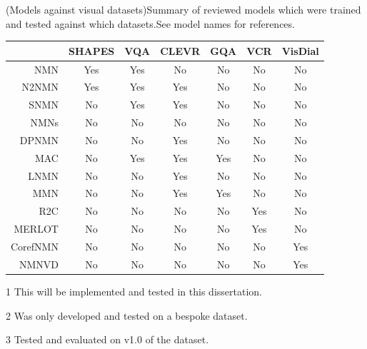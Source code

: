 \begin{table}[]
\captionsource(Models against visual datasets){Summary of reviewed models which were trained and tested against which datasets.\label{tab:models_against_datasets}}{See model names for references.}
\begin{threeparttable}
    \begin{tabular}{@{}rcccccc@{}}
        \toprule
                    & SHAPES & VQA          & CLEVR & GQA & VCR & VisDial \\ \midrule
        NMN\cite{andreas_neural_2016}               & Yes    & Yes          & No    & No  & No  & No      \\
        N2NMN\cite{hu_learning_2017}                & Yes    & Yes          & Yes   & No  & No  & No      \\
        SNMN\cite{hu_explainable_2019}              & No     & Yes          & Yes   & No  & No\tnote{1} & No      \\
        NMNs\pm{}\cite{chen_teaching_2022}\tnote{2} & No     & No           & No    & No  & No  & No      \\
        DPNMN\cite{su_toward_2020}                  & No     & No           & Yes   & No  & No  & No      \\
        MAC\cite{hudson_compositional_2018}         & No     & Yes\tnote{3} & Yes   & Yes & No  & No      \\
        LNMN\cite{pahuja_learning_2019}             & No     & No           & Yes   & No  & No  & No      \\
        MMN\cite{chen_meta_2020}                    & No     & No           & Yes   & Yes & No  & No      \\
        R2C\cite{zellers_recognition_2019}          & No     & No           & No    & No  & Yes & No      \\
        MERLOT\cite{zellers_merlot_2022}            & No     & No           & No    & No  & Yes & No      \\
        CorefNMN\cite{kottur_visual_2018}           & No     & No           & No    & No  & No  & Yes     \\
        NMNVD\cite{cho_visual_2021}                 & No     & No           & No    & No  & No  & Yes     \\ \bottomrule
    \end{tabular}
    \begin{tablenotes}
        \item[1] This will be implemented and tested in this dissertation.
        \item[2] Was only developed and tested on a bespoke dataset\cite{chen_teaching_2022}.
        \item[3] Tested and evaluated on v1.0 of the dataset\cite{hudson_compositional_2018}.
    \end{tablenotes}
\end{threeparttable}
\end{table}

